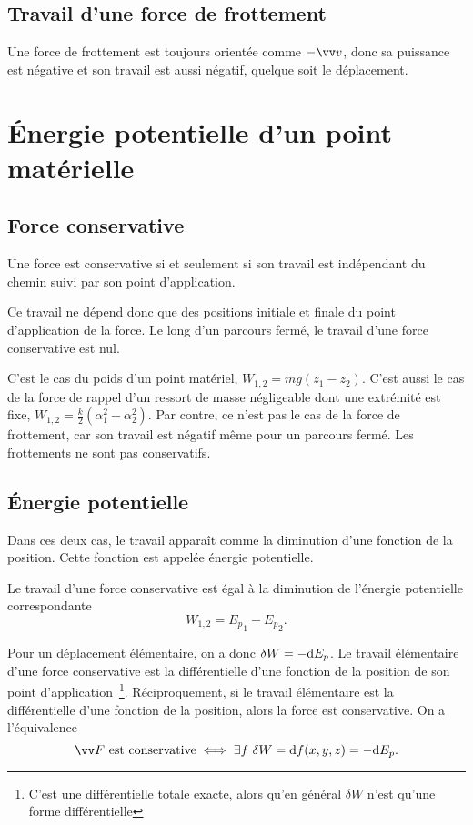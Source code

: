 \subsection{Travail d'une force de frottement}%
\label{chap4-subsec:travaildufrottement}%

Une force de frottement est toujours orientée comme \(-\vvv\), donc sa 
puissance est négative et son travail est aussi négatif, quelque soit le 
déplacement.

\section{Énergie potentielle d'un point matérielle}%
\label{chap4-sec:energiepotentielle}%
\subsection{Force conservative}%
\label{chap4-subsec:forceconservative}%
\begin{defdef}%
  Une force est conservative si et seulement si son travail est indépendant du 
  chemin suivi par son point d'application.
\end{defdef}%

Ce travail ne dépend donc que des positions initiale et finale du point 
d'application de la force. Le long d'un parcours fermé, le travail d'une force 
conservative est nul.

C'est le cas du poids d'un point matériel, \(W_{1,2}=mg(z_1-z_2)\). C'est aussi 
le cas de la force de rappel d'un ressort de masse négligeable dont une 
extrémité est fixe, \(W_{1, 2} = \frac{k}{2}(\alpha_1^2 - \alpha_2^2)\). Par 
contre, ce n'est pas le cas de la force de frottement, car son travail est 
négatif même pour un parcours fermé. Les frottements ne sont pas conservatifs.

\subsection{Énergie potentielle}%
\label{chap4-subsec:energiepotentielle}%

Dans ces deux cas, le travail apparaît comme la diminution d'une fonction de la 
position. Cette fonction est appelée énergie potentielle.
\begin{defdef}%
  Le travail d'une force conservative est égal à la diminution de l'énergie 
  potentielle correspondante
  \begin{equation}
    W_{1, 2}={E_p}_1 -{E_p}_2.
  \end{equation}
\end{defdef}%
Pour un déplacement élémentaire, on a donc \(\delta W = -\mathrm{d} E_p\). Le travail 
élémentaire d'une force conservative est la différentielle d'une fonction de la 
position de son point d'application~\footnote{C'est une différentielle totale 
exacte, alors qu'en général \(\delta W\) n'est qu'une forme différentielle}. 
Réciproquement, si le travail élémentaire est la différentielle d'une fonction 
de la position, alors la force est conservative. On a l'équivalence
\begin{equation}%
  \vF \text{~est conservative} \iff \exists f \ \delta W = \D f(x,y,z) = -\D 
  E_p.
\end{equation}%

